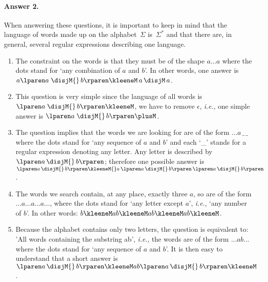 \paragraph{Answer 2.}

When answering these questions, it is important to keep in mind that
the language of words made up on the alphabet~\(\Sigma\)
is~\(\Sigma^{*}\) and that there are, in general, several regular
expressions describing one language.

\begin{enumerate}

  \item The constraint on the words is that they must be of the shape
    \(a \ldots a\) where the dots stand for `any combination of \(a\)
    and \(b\)'. In other words, one answer is \(a \lparen a \;
    \disjM{} \, b\rparen\kleeneM \, a \, \disjM \, a\).

  \item This question is very simple since the language of all words
    is \(\lparen a \; \disjM{} \, b\rparen\kleeneM\), we have to
    remove \(\epsilon\), \emph{i.e.,} one simple answer is \(\lparen a \;
    \disjM{} \, b\rparen\plusM\).

  \item The question implies that the words we are looking for are of
    the form \(\ldots a \, \_ \, \_\) where the dots stand for `any
    sequence of \(a\) and \(b\)' and each `\_' stands for a regular
    expression denoting any letter. Any letter is described
    by \(\lparen a \, \disjM{} \, b\rparen\); therefore one possible
    answer is \(\lparen a \, \disjM{} \, b\rparen\kleeneM{}
    a \, \lparen a \, \disjM{} \, b\rparen \, \lparen a \, \disjM{} \,
    b\rparen\).

  \item The words we search contain, at any place, exactly three
    \(a\), so are of the form \(\ldots a \ldots a \ldots a \ldots\),
    where the dots stand for `any letter except \(a\)', \emph{i.e.,} `any
    number of \(b\)'. In other words: \(b\kleeneM a b\kleeneM a
    b\kleeneM a b\kleeneM\).

  \item Because the alphabet contains only two letters, the question
    is equivalent to: 'All words containing the substring
    ab', \emph{i.e.,} the words are of the form \(\ldots ab \ldots\)
    where the dots stand for `any sequence of \(a\) and \(b\)'. It is
    then easy to understand that a short answer is \(\lparen
    a \, \disjM{} \, b\rparen\kleeneM ab \lparen a \, \disjM{} \,
    b\rparen\kleeneM\).


\end{enumerate}
